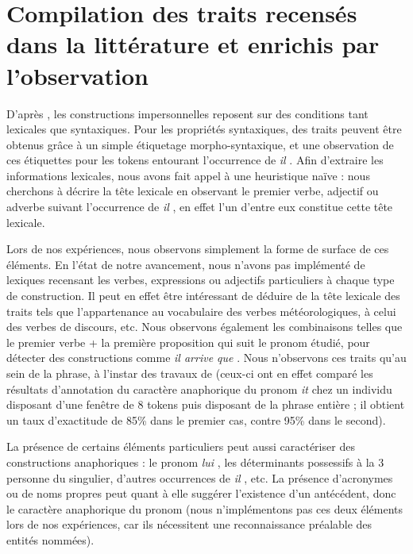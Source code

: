 \documentclass[a4paper,12pt]{article}
\begin{document}
\section{Compilation des traits recensés dans la littérature et enrichis par l'observation}
\label{approche-traits}

\color{gray}

D'après \citeauthor{danlos-ilimp-taln2005}, les constructions impersonnelles reposent sur des conditions tant lexicales que syntaxiques. Pour les propriétés syntaxiques, des traits peuvent \^etre obtenus grâce à un simple étiquetage morpho-syntaxique, et une observation de ces étiquettes pour les tokens entourant l'occurrence de \og \textit{il} \fg{}. Afin d'extraire les informations lexicales, nous avons fait appel à une heuristique naïve : nous cherchons à décrire la tête lexicale en observant le premier verbe, adjectif ou adverbe suivant l'occurrence de \og \textit{il} \fg{}, en effet l'un d'entre eux constitue cette tête lexicale.

Lors de nos expériences, nous observons simplement la forme de surface de ces éléments. En l'état de notre avancement, nous n'avons pas implémenté de lexiques recensant les verbes, expressions ou adjectifs particuliers à chaque type de construction. Il peut en effet être intéressant de déduire de la tête lexicale des traits tels que l'appartenance au vocabulaire des verbes météorologiques, à celui des verbes de discours, etc.
Nous observons également les combinaisons telles que le premier verbe + la première proposition qui suit le pronom étudié, pour détecter des constructions comme \og \textit{il arrive que} \fg{}. Nous n'observons ces traits qu'au sein de la phrase, à l'instar des travaux de \citeauthor{Bergsma-11} (ceux-ci ont en effet comparé les résultats d'annotation du caractère anaphorique du pronom \og{}\textit{it}\fg{} chez un individu disposant d'une fenêtre de 8 tokens puis disposant de la phrase entière ; il obtient un taux d'exactitude de 85\% dans le premier cas, contre 95\% dans le second).

La présence de certains éléments particuliers peut aussi caractériser des constructions anaphoriques : le pronom \og \textit{lui} \fg{}, les déterminants possessifs à la 3 personne du singulier, d'autres occurrences de \og \textit{il} \fg{}, etc. La présence d'acronymes ou de noms propres peut quant à elle suggérer l'existence d'un antécédent, donc le caractère anaphorique du pronom (nous n'implémentons pas ces deux éléments lors de nos expériences, car ils nécessitent une reconnaissance préalable des entités nommées).
\end{document}
